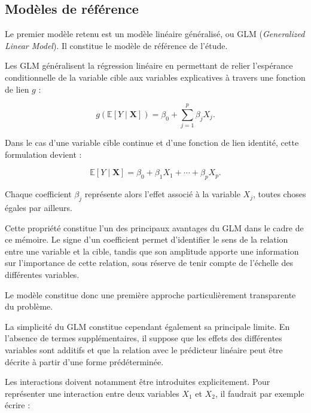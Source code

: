 \subsection{Modèles de référence}

Le premier modèle retenu est un modèle linéaire généralisé, ou GLM (\textit{Generalized Linear Model}). Il constitue le modèle de référence de l'étude.

Les GLM généralisent la régression linéaire en permettant de relier l'espérance conditionnelle de la variable cible aux variables explicatives à travers une fonction de lien $g$ :

\begin{equation}
    g\left(
    \mathbb{E}
    \left[
    Y \mid \mathbf{X}
    \right]
    \right)
    =
    \beta_0
    +
    \sum_{j=1}^{p}
    \beta_j X_j.
    \label{eq:glm}
\end{equation}

Dans le cas d'une variable cible continue et d'une fonction de lien identité, cette formulation devient :

\begin{equation}
    \mathbb{E}
    \left[
    Y \mid \mathbf{X}
    \right]
    =
    \beta_0
    +
    \beta_1X_1
    +
    \cdots
    +
    \beta_pX_p.
\end{equation}

Chaque coefficient $\beta_j$ représente alors l'effet associé à la variable $X_j$, toutes choses égales par ailleurs.

Cette propriété constitue l'un des principaux avantages du GLM dans le cadre de ce mémoire. Le signe d'un coefficient permet d'identifier le sens de la relation entre une variable et la cible, tandis que son amplitude apporte une information sur l'importance de cette relation, sous réserve de tenir compte de l'échelle des différentes variables.

Le modèle constitue donc une première approche particulièrement transparente du problème.

La simplicité du GLM constitue cependant également sa principale limite. En l'absence de termes supplémentaires, il suppose que les effets des différentes variables sont additifs et que la relation avec le prédicteur linéaire peut être décrite à partir d'une forme prédéterminée.

Les interactions doivent notamment être introduites explicitement. Pour représenter une interaction entre deux variables $X_1$ et $X_2$, il faudrait par exemple écrire :

